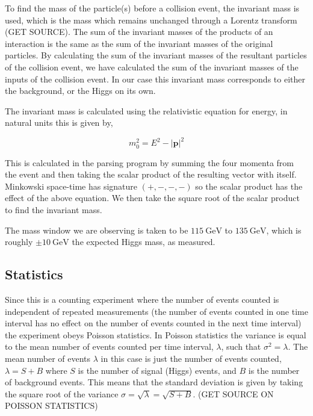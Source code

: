 \documentclass[11pt]{amsart}
\begin{document}
\begin{multicols}{2}
To find the mass of the particle(s) before a collision event, the invariant mass is used, which is the mass which remains unchanged through a Lorentz transform (GET SOURCE). The sum of the invariant masses of the products of an interaction is the same as the sum of the invariant masses of the original particles. By calculating the sum of the invariant masses of the resultant particles of the collision event, we have calculated the sum of the invariant masses of the inputs of the collision event. In our case this invariant mass corresponds to either the background, or the Higgs on its own.

The invariant mass is calculated using the relativistic equation for energy, in natural units this is given by,

\begin{equation}
  \label{eq:invariantmass}
  m_0^2 = E^2 - {|\mathbf{p}|}^2
\end{equation}

This is calculated in the parsing program by summing the four momenta from the event and then taking the scalar product of the resulting vector with itself. Minkowski space-time has signature $(+, -, -, -)$ so the scalar product has the effect of the above equation. We then take the square root of the scalar product to find the invariant mass. \cite{kinematics}

The mass window we are observing is taken to be $\SI{115}{\giga\electronvolt}$ to $\SI{135}{\giga\electronvolt}$, which is roughly $\pm \SI{10}{\giga\electronvolt}$ the expected Higgs mass, as measured. \cite{Higgs}

\subsection{Statistics}

Since this is a counting experiment where the number of events counted is independent of repeated measurements (the number of events counted in one time interval has no effect on the number of events counted in the next time interval) the experiment obeys Poisson statistics. In Poisson statistics the variance is equal to the mean number of events counted per time interval, $\lambda$, such that $\sigma^2 = \lambda$. The mean number of events $\lambda$ in this case is just the number of events counted, $\lambda = S + B$ where $S$ is the number of signal (Higgs) events, and $B$ is the number of background events. This means that the standard deviation is given by taking the square root of the variance $\sigma = \sqrt{\lambda} = \sqrt{S + B}$. (GET SOURCE ON POISSON STATISTICS)


\end{multicols}
\end{document}

